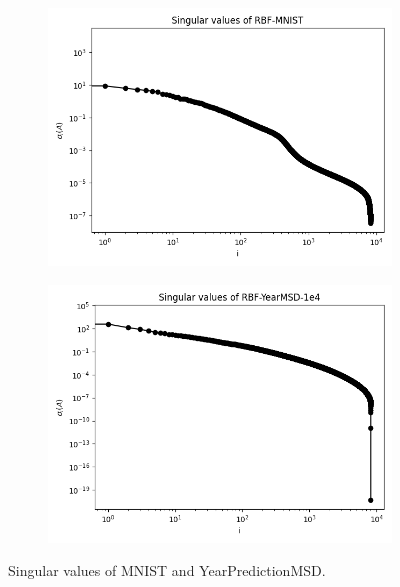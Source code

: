 \documentclass{article}
\theoremstyle{definition}
\begin{document}
\begin{figure}
\centering
\hfill\begin{subfigure}[t]{\textwidth+20pt\relax}
    \includegraphics[width=\dimexpr\linewidth-20pt\relax]{plots/singular_values/singular_values_RBF-MNIST.png}
\end{subfigure}\hspace{3ex}
\begin{subfigure}[t]{\textwidth+20pt\relax}
    \includegraphics[width=\dimexpr\linewidth-20pt\relax]{plots/singular_values/singular_values_RBF-YearMSD-1e4.png}
\end{subfigure}\hfill
\caption{Singular values of MNIST and YearPredictionMSD.}
\label{fig:singularValue}
\end{figure}
\end{document}
